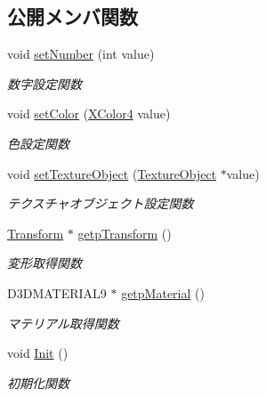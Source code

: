 \subsection*{公開メンバ関数}
\begin{DoxyCompactItemize}
\item 
void \mbox{\hyperlink{class_numbers_polygon_1_1_number_polygon_aed0291a733964cf55fc0b64e7cb94913}{set\+Number}} (int value)
\begin{DoxyCompactList}\small\item\em 数字設定関数 \end{DoxyCompactList}\item 
void \mbox{\hyperlink{class_numbers_polygon_1_1_number_polygon_aa3f7ad5e57a7c517637713e93b923def}{set\+Color}} (\mbox{\hyperlink{_vector3_d_8h_a680c30c4a07d86fe763c7e01169cd6cc}{X\+Color4}} value)
\begin{DoxyCompactList}\small\item\em 色設定関数 \end{DoxyCompactList}\item 
void \mbox{\hyperlink{class_numbers_polygon_1_1_number_polygon_a93cf66894af5d7f93eeba793c9776fdf}{set\+Texture\+Object}} (\mbox{\hyperlink{class_texture_object}{Texture\+Object}} $\ast$value)
\begin{DoxyCompactList}\small\item\em テクスチャオブジェクト設定関数 \end{DoxyCompactList}\item 
\mbox{\hyperlink{class_transform}{Transform}} $\ast$ \mbox{\hyperlink{class_numbers_polygon_1_1_number_polygon_adbbd23d716cb041a0ab1c1f71e7a2cc9}{getp\+Transform}} ()
\begin{DoxyCompactList}\small\item\em 変形取得関数 \end{DoxyCompactList}\item 
D3\+D\+M\+A\+T\+E\+R\+I\+A\+L9 $\ast$ \mbox{\hyperlink{class_numbers_polygon_1_1_number_polygon_a1e7a8d196f26c95461e99f393667f300}{getp\+Material}} ()
\begin{DoxyCompactList}\small\item\em マテリアル取得関数 \end{DoxyCompactList}\item 
void \mbox{\hyperlink{class_numbers_polygon_1_1_number_polygon_af4d9476caf03b0cb7971d66361b61fdb}{Init}} ()
\begin{DoxyCompactList}\small\item\em 初期化関数 \end{DoxyCompactList}\item 

\end{DoxyCompactItemize}

